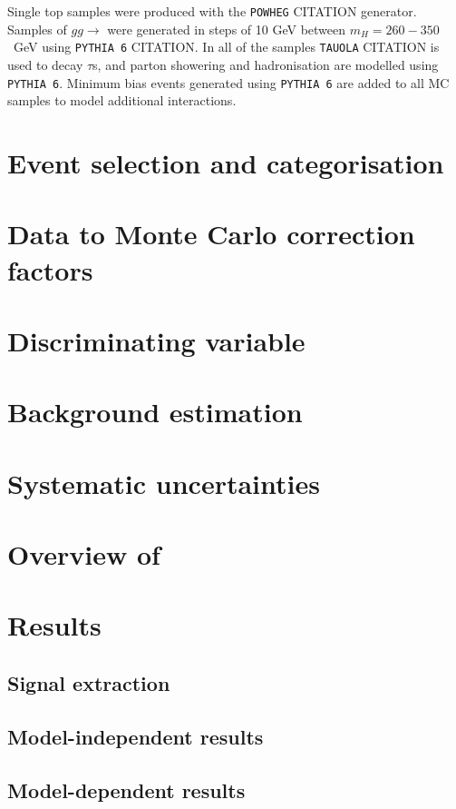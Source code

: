 Single top samples were produced with the \texttt{POWHEG} CITATION generator. Samples of $gg\rightarrow$\hhhtautaubb
were generated in steps of 10 GeV between $m_H = 260 - 350$~GeV using \texttt{PYTHIA 6} CITATION. In all of the samples
\texttt{TAUOLA} CITATION is used to decay $\tau$s, and parton showering and hadronisation are modelled using \texttt{PYTHIA 6}.
Minimum bias events generated using \texttt{PYTHIA 6} are added to all MC samples to model additional
interactions. 
\vfill

\section{Event selection and categorisation}
\label{sec:hhh_selection}

\section{Data to Monte Carlo correction factors}
\label{sec:hhh_datamc}

\section{Discriminating variable}
\label{sec:hhh_discr}

\section{Background estimation}
\label{sec:hhh_backgrounds}

\section{Systematic uncertainties}
\label{sec:hhh_uncs}

\section{\texorpdfstring{Overview of \azhlltautau}{Overview of A->Zh->lltautau}}
\label{sec:hhh_azh}

\section{Results}
\label{sec:hhh_results}

\subsection{Signal extraction}
\label{sec:hhh_results_extraction}

\subsection{Model-independent results}
\label{sec:hhh_results_modelindep}


\subsection{Model-dependent results}
\label{sec:hhh_results_modeldep}


